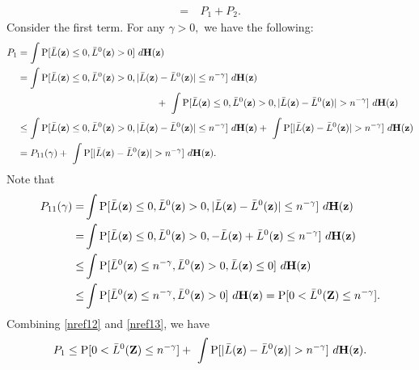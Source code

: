 \documentclass[twoside]{article}
\newcommand{\bZ}{\mathbf{Z}}
\newcommand{\bH}{\mathbf{H}}
\newcommand{\bz}{\mathbf{z}}
\newcommand{\0}{\mathbf{0}}
\newcommand{\1}{\mathbf{1}}
\numberwithin{equation}{section}
\begin{document}
\begin{enumerate}[(a)]
\begin{align}
    =&\ P_1 + P_2.
\end{align}
Consider the first term. For any $\gamma>0,$ we have the following:
\begin{align}\label{nref12}
    P_1 &= \int {\rm P}[\bar{L}(\bz)\leq 0,\bar{L}^0(\bz)> 0]\ d\bH(\bz)\nonumber\\
    &= \int {\rm P}[\bar{L}(\bz)\leq 0,\bar{L}^0(\bz)> 0, |\bar{L}(\bz)-\bar{L}^0(\bz)|\leq n^{-\gamma}]\ d\bH(\bz) \nonumber \\
    &\hspace{2in}+\ \int {\rm P}[\bar{L}(\bz)\leq 0,\bar{L}^0(\bz)> 0, |\bar{L}(\bz)-\bar{L}^0(\bz)|> n^{-\gamma}]\ d\bH(\bz)\nonumber\\
    &\leq \int {\rm P}[\bar{L}(\bz)\leq 0,\bar{L}^0(\bz)> 0, |\bar{L}(\bz)-\bar{L}^0(\bz)|\leq n^{-\gamma}]\ d\bH(\bz) +\ \int {\rm P}[|\bar{L}(\bz)-\bar{L}^0(\bz)|> n^{-\gamma}]\ d\bH(\bz)\nonumber\\
    &= P_{11}(\gamma) + \ \int {\rm P}[|\bar{L}(\bz)-\bar{L}^0(\bz)|> n^{-\gamma}]\ d\bH(\bz).
\end{align}
Note that
\begin{align}\label{nref13}
    P_{11}(\gamma) =& \int {\rm P}[\bar{L}(\bz)\leq 0,\bar{L}^0(\bz)> 0, |\bar{L}(\bz)-\bar{L}^0(\bz)|\leq n^{-\gamma}]\ d\bH(\bz) \nonumber\\
    =& \int {\rm P}[\bar{L}(\bz)\leq 0,\bar{L}^0(\bz)> 0, -\bar{L}(\bz)+\bar{L}^0(\bz)\leq n^{-\gamma}]\ d\bH(\bz) \nonumber\\
    \leq & \int {\rm P}[\bar{L}^0(\bz)\leq n^{-\gamma}, \bar{L}^0(\bz)>0,\bar{L}(\bz)\leq 0]\ d\bH(\bz)\nonumber\\
    \leq & \int {\rm P}[\bar{L}^0(\bz)\leq n^{-\gamma}, \bar{L}^0(\bz)>0]\ d\bH(\bz)= {\rm P}[0<\bar{L}^0(\bZ)\leq n^{-\gamma}].
\end{align}
Combining \eqref{nref12} and \eqref{nref13}, we have
\begin{align}\label{nrefP1}
    P_1 \leq {\rm P}[0<\bar{L}^0(\bZ)\leq n^{-\gamma}] + \ \int {\rm P}[|\bar{L}(\bz)-\bar{L}^0(\bz)|> n^{-\gamma}]\ d\bH(\bz).
\end{align}


\end{enumerate}
\end{document}
